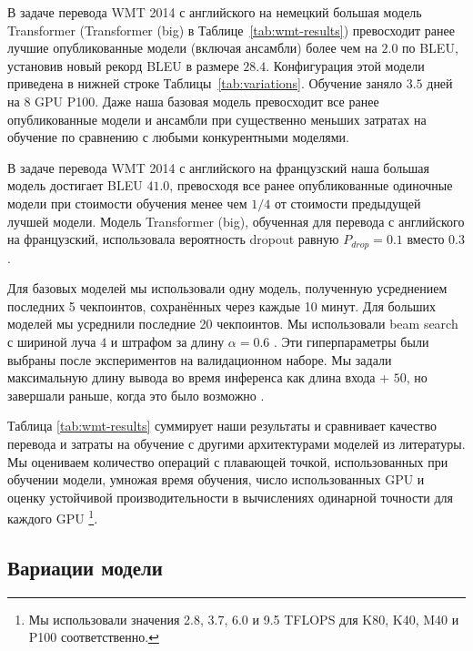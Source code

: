 \documentclass{article}
\begin{document}
В задаче перевода WMT 2014 с английского на немецкий большая модель Transformer (Transformer (big) в Таблице~\ref{tab:wmt-results}) превосходит ранее лучшие опубликованные модели (включая ансамбли) более чем на $2.0$ по BLEU, установив новый рекорд BLEU в размере $28.4$. Конфигурация этой модели приведена в нижней строке Таблицы~\ref{tab:variations}. Обучение заняло $3.5$ дней на $8$ GPU P100. Даже наша базовая модель превосходит все ранее опубликованные модели и ансамбли при существенно меньших затратах на обучение по сравнению с любыми конкурентными моделями.

В задаче перевода WMT 2014 с английского на французский наша большая модель достигает BLEU $41.0$, превосходя все ранее опубликованные одиночные модели при стоимости обучения менее чем $1/4$ от стоимости предыдущей лучшей модели. Модель Transformer (big), обученная для перевода с английского на французский, использовала вероятность dropout равную $P_{drop}=0.1$ вместо $0.3$.

Для базовых моделей мы использовали одну модель, полученную усреднением последних 5 чекпоинтов, сохранённых через каждые 10 минут. Для больших моделей мы усреднили последние 20 чекпоинтов. Мы использовали beam search с шириной луча $4$ и штрафом за длину $\alpha=0.6$ \citep{wu2016google}. Эти гиперпараметры были выбраны после экспериментов на валидационном наборе. Мы задали максимальную длину вывода во время инференса как длина входа + $50$, но завершали раньше, когда это было возможно \citep{wu2016google}.

Таблица \ref{tab:wmt-results} суммирует наши результаты и сравнивает качество перевода и затраты на обучение с другими архитектурами моделей из литературы. Мы оцениваем количество операций с плавающей точкой, использованных при обучении модели, умножая время обучения, число использованных GPU и оценку устойчивой производительности в вычислениях одинарной точности для каждого GPU \footnote{Мы использовали значения 2.8, 3.7, 6.0 и 9.5 TFLOPS для K80, K40, M40 и P100 соответственно.}.

\subsection{Вариации модели}
\end{document}
